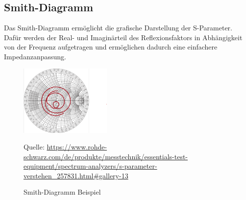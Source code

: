 \subsection{Smith-Diagramm}
Das Smith-Diagramm ermöglicht die grafische Darstellung der S-Parameter.
Dafür werden der Real- und Imaginärteil des Reflexionsfaktors in Abhängigkeit von der Frequenz
aufgetragen und ermöglichen dadurch eine einfachere Impedanzanpassung.
\begin{figure}[H]
    \centering
    \includegraphics[width=0.4\textwidth]{Pictures/SmithDiagram.png}
    \caption{Smith-Diagramm Beispiel}
    \footnotesize{Quelle: \url{https://www.rohde-schwarz.com/de/produkte/messtechnik/essentials-test-equipment/spectrum-analyzers/s-parameter-verstehen_257831.html#gallery-13}}
\end{figure}

\clearpage